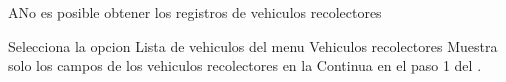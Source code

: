 	\begin{UCtrayectoriaA}{A}{No es posible obtener los registros de vehiculos recolectores }
		
	\UCpaso[\UCactor]Selecciona la opcion Lista de vehiculos  del menu Vehiculos recolectores
	\UCpaso Muestra solo los campos de los vehiculos recolectores  en la   
		\UCpaso Continua en el paso 1 del . 

\end{UCtrayectoriaA}



		
